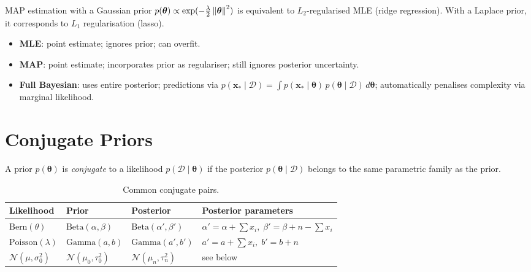 \begin{remark}
MAP estimation with a Gaussian prior $p(\bm{\theta})\propto\exp(-\frac{\lambda}{2}\left\| \bm{\theta} \right\|^2)$ is equivalent to $L_2$-regularised MLE (ridge regression). With a Laplace prior, it corresponds to $L_1$ regularisation (lasso).
\end{remark}

\begin{keyformulas}[title=\textbf{MLE vs MAP vs Full Bayesian}]
\begin{itemize}
  \item \textbf{MLE}: point estimate; ignores prior; can overfit.
  \item \textbf{MAP}: point estimate; incorporates prior as regulariser; still ignores posterior uncertainty.
  \item \textbf{Full Bayesian}: uses entire posterior; predictions via $p(\bm{x}_*\mid\mathcal{D})=\int p(\bm{x}_*\mid\bm{\theta})\,p(\bm{\theta}\mid\mathcal{D})\,d\bm{\theta}$; automatically penalises complexity via marginal likelihood.
\end{itemize}
\end{keyformulas}

\section{Conjugate Priors}

\begin{definition}
A prior $p(\bm{\theta})$ is \emph{conjugate} to a likelihood $p(\mathcal{D}\mid\bm{\theta})$ if the posterior $p(\bm{\theta}\mid\mathcal{D})$ belongs to the same parametric family as the prior.
\end{definition}

\begin{table}[ht]
\centering
\caption{Common conjugate pairs.}
\label{tab:conjugate}
\begin{tabular}{llll}
\toprule
\textbf{Likelihood} & \textbf{Prior} & \textbf{Posterior} & \textbf{Posterior parameters} \\
\midrule
$\text{Bern}(\theta)$ & $\text{Beta}(\alpha,\beta)$ & $\text{Beta}(\alpha',\beta')$ &
  $\alpha'=\alpha+\sum x_i,\;\beta'=\beta+n-\sum x_i$ \\
$\text{Poisson}(\lambda)$ & $\text{Gamma}(a,b)$ & $\text{Gamma}(a',b')$ &
  $a'=a+\sum x_i,\;b'=b+n$ \\
$\mathcal{N}(\mu,\sigma^2_0)$ & $\mathcal{N}(\mu_0,\tau_0^2)$ & $\mathcal{N}(\mu_n,\tau_n^2)$ &
  see below \\
\bottomrule
\end{tabular}
\end{table}

